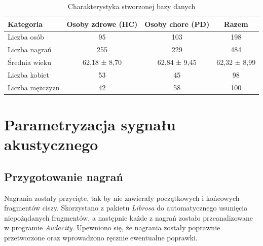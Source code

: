 \begin{table}[h]
\centering
\caption{Charakterystyka stworzonej bazy danych}
\label{tab:summary-database}
\begin{tabular}{|l|c|c|c|}
\hline
\textbf{Kategoria} &\textbf{Osoby zdrowe (HC)} &\textbf{Osoby chore (PD)} &\textbf{Razem} \\ \hline
Liczba osób &95 &103 &198\\ \hline
Liczba nagrań &255 &229 &484\\ \hline
Średnia wieku & 62,18 ± 8,70 & 62,84 ± 9,45  & 62,32 ± 8,99 \\ \hline
Liczba kobiet &53 &45 &98\\ \hline
Liczba mężczyzn &42 &58 &100 \\ \hline
\end{tabular}
\end{table}




\section{Parametryzacja sygnału akustycznego}
\label{sec:parametryzacja-sygnalu-akustycznego}


\subsection{Przygotowanie nagrań}
\label{subsec:preprocessing}

Nagrania zostały przycięte, tak by nie zawierały początkowych i końcowych fragmentów ciszy.
Skorzystano z pakietu \emph{Librosa} do automatycznego usunięcia niepożądanych fragmentów, a następnie każde z nagrań zostało przeanalizowane w programie \emph{Audacity}.
Upewniono się, że nagrania zostały poprawnie przetworzone oraz wprowadzono ręcznie ewentualne poprawki.


